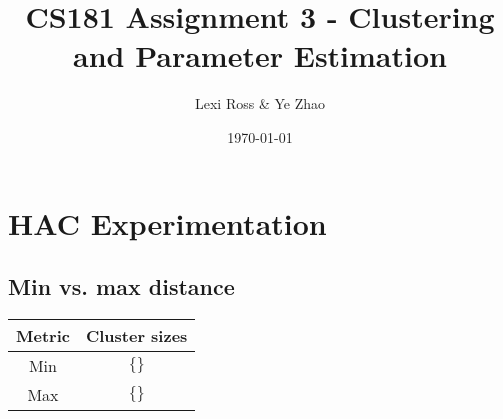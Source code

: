 \documentclass[11pt]{article}
\title{\bf CS181 Assignment 3 - Clustering and Parameter Estimation}
\date{\today}
\author{Lexi Ross \& Ye Zhao}
\begin{document}
\maketitle



\section{HAC Experimentation}
\subsection{Min vs. max distance}
\begin{center}
\begin{tabular}{c | c}
Metric & Cluster sizes \\ \hline
Min & $\{ \}$ \\ \hline
Max & $\{ \}$ \\ \hline
\end{tabular}
\end{center}
\end{document}
